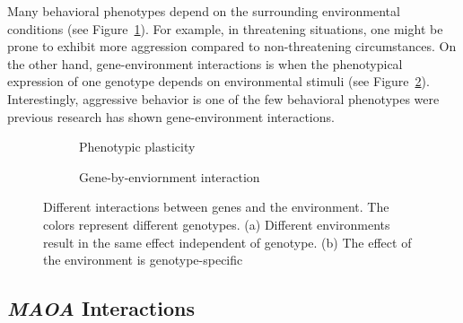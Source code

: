 Many behavioral phenotypes depend on the surrounding environmental conditions (see Figure~\ref{fig:plasticity}).
For example, in threatening situations, one might be prone to exhibit more aggression compared to non-threatening circumstances. 
On the other hand, gene-environment interactions is when the phenotypical expression of one genotype depends on environmental stimuli (see Figure~\ref{fig:gene_env_interaction}).
Interestingly, aggressive behavior is one of the few behavioral phenotypes were previous research has shown gene-environment interactions.

\begin{figure}[!htp]
  \centering
  \begin{subfigure}[t]{0.4\textwidth}
    \centering
    \resizebox{\linewidth}{!}{}
    \caption{Phenotypic plasticity}\label{fig:plasticity}
  \end{subfigure}
  \begin{subfigure}[t]{0.4\textwidth}
    \centering
    \resizebox{\linewidth}{!}{}
    \caption{Gene-by-enviornment interaction}\label{fig:gene_env_interaction}
  \end{subfigure}
  \caption[Gene-Environment Interactions]{Different interactions between genes and the environment. 
    The colors represent different genotypes. 
    (a) Different environments result in the same effect independent of genotype.
    (b) The effect of the environment is genotype-specific}\label{fig:env_interactions}
\end{figure}

\subsection{\textit{MAOA} Interactions}
\label{sub:maoa_interactions}

